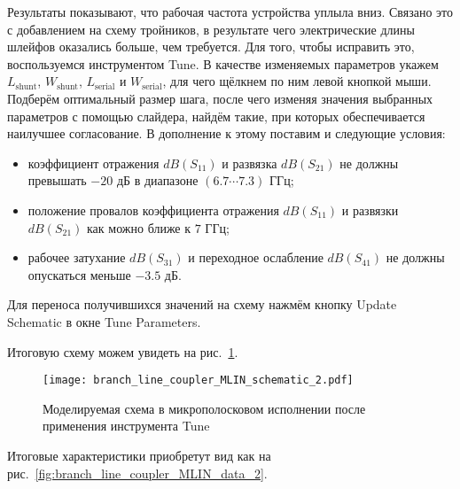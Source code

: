 Результаты показывают, что рабочая частота устройства уплыла вниз. Связано это с добавлением на схему тройников, в результате чего электрические длины шлейфов оказались больше, чем требуется.
Для того, чтобы исправить это, воспользуемся инструментом Tune.
В качестве изменяемых параметров укажем $L_\text{shunt}$, $W_\text{shunt}$, $L_\text{serial}$ и $W_\text{serial}$, для чего щёлкнем по ним левой кнопкой мыши.
Подберём оптимальный размер шага, после чего изменяя значения выбранных параметров с помощью слайдера, найдём такие, при которых обеспечивается наилучшее согласование.
В дополнение к этому поставим и следующие условия:
\begin{itemize}
    \item коэффициент отражения $dB(S_{11})$ и развязка $dB(S_{21})$ не должны превышать $-20 \text{~дБ}$ в диапазоне $(6.7 \cdots 7.3) \text{~ГГц}$;
    \item положение провалов коэффициента отражения $dB(S_{11})$ и развязки $dB(S_{21})$ как можно ближе к $7 \text{~ГГц}$;
    \item рабочее затухание $dB(S_{31})$ и переходное ослабление $dB(S_{41})$ не должны опускаться меньше $-3.5 \text{~дБ}$.
\end{itemize}
Для переноса получившихся значений на схему нажмём кнопку Update Schematic в окне Tune Parameters.

Итоговую схему можем увидеть на рис.~\ref{fig:branch_line_coupler_MLIN_schematic_2}.

\begin{figure}
    \centering
    \texttt{[image: branch\_line\_coupler\_MLIN\_schematic\_2.pdf]}
    \caption{Моделируемая схема в микрополосковом исполнении после применения инструмента Tune}%
    \label{fig:branch_line_coupler_MLIN_schematic_2}
\end{figure}

Итоговые характеристики приобретут вид как на рис.~\ref{fig:branch_line_coupler_MLIN_data_2}.

